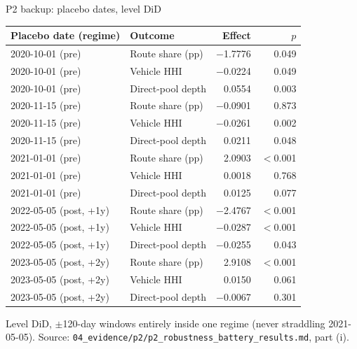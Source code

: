 \documentclass[aspectratio=169]{beamer}
\begin{document}
\begin{frame}{P2 backup: placebo dates, level DiD}
  \footnotesize
  \begin{center}
  \begin{tabular}{@{}l l r r@{}}
    \toprule
    Placebo date (regime) & Outcome & Effect & $p$ \\
    \midrule
    2020-10-01 (pre) & Route share (pp) & $-$1.7776 & 0.049 \\
    2020-10-01 (pre) & Vehicle HHI & $-$0.0224 & 0.049 \\
    2020-10-01 (pre) & Direct-pool depth & 0.0554 & 0.003 \\
    2020-11-15 (pre) & Route share (pp) & $-$0.0901 & 0.873 \\
    2020-11-15 (pre) & Vehicle HHI & $-$0.0261 & 0.002 \\
    2020-11-15 (pre) & Direct-pool depth & 0.0211 & 0.048 \\
    2021-01-01 (pre) & Route share (pp) & 2.0903 & $<$0.001 \\
    2021-01-01 (pre) & Vehicle HHI & 0.0018 & 0.768 \\
    2021-01-01 (pre) & Direct-pool depth & 0.0125 & 0.077 \\
    2022-05-05 (post, +1y) & Route share (pp) & $-$2.4767 & $<$0.001 \\
    2022-05-05 (post, +1y) & Vehicle HHI & $-$0.0287 & $<$0.001 \\
    2022-05-05 (post, +1y) & Direct-pool depth & $-$0.0255 & 0.043 \\
    2023-05-05 (post, +2y) & Route share (pp) & 2.9108 & $<$0.001 \\
    2023-05-05 (post, +2y) & Vehicle HHI & 0.0150 & 0.061 \\
    2023-05-05 (post, +2y) & Direct-pool depth & $-$0.0067 & 0.301 \\
    \bottomrule
  \end{tabular}
  \end{center}
  \vspace{-0.3em}
  {\scriptsize Level DiD, $\pm$120-day windows entirely inside one regime (never straddling 2021-05-05). Source: \texttt{04\_evidence/p2/p2\_robustness\_battery\_results.md}, part (i).}
\end{frame}
\end{document}
